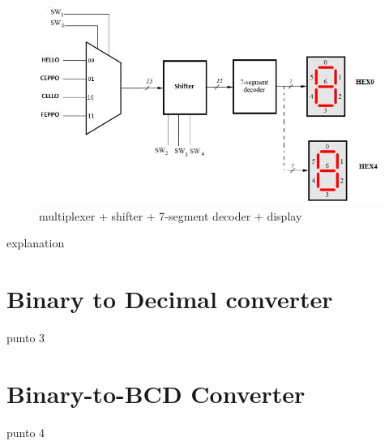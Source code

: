 \documentclass[12pt]{article}
\begin{document}
\begin{figure}[h]
	\centering
	\includegraphics[scale = 0.7]{Berchialla_PuntoB/image1.jpg}
	\caption{multiplexer + shifter + 7-segment decoder + display}
\end{figure}


explanation

\section{ Binary to Decimal converter}
punto 3
\section{ Binary-to-BCD Converter}
punto 4
\end{document}
